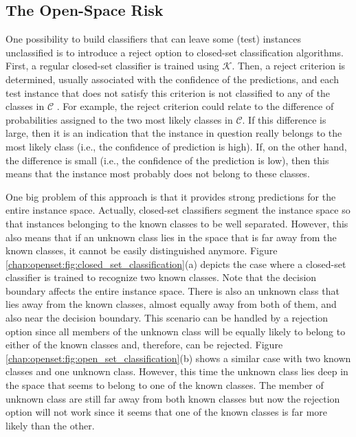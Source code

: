 \subsection{The Open-Space Risk}
\label{chap:openset:sec:open_space_risk}

One possibility to build classifiers that can leave some (test) instances unclassified is to introduce a reject option to closed-set classification algorithms. First, a regular closed-set classifier is trained using $\mathcal{K}$. Then, a reject criterion is determined, usually associated with the confidence of the predictions, and each test instance that does not satisfy this criterion is not classified to any of the classes in $\mathcal{C}$ \parencite{onan2018ensemble}. For example, the reject criterion could relate to the difference of probabilities assigned to the two most likely classes in $\mathcal{C}$. If this difference is large, then it is an indication that the instance in question really belongs to the most likely class (i.e., the confidence of prediction is high). If, on the other hand, the difference is small (i.e., the confidence of the prediction is low), then this means that the instance most probably does not belong to these classes. 

One big problem of this approach is that it provides strong predictions for the entire instance space. Actually, closed-set classifiers segment the instance space so that instances belonging to the known classes to be well separated. However, this also means that if an unknown class lies in the space that is far away from the known classes, it cannot be easily distinguished anymore. Figure \ref{chap:openset:fig:closed_set_classification}(a) depicts the case where a closed-set classifier is trained to recognize two known classes. Note that the decision boundary affects the entire instance space. There is also an unknown class that lies away from the known classes, almost equally away from both of them, and also near the decision boundary. This scenario can be handled by a rejection option since all members of the unknown class will be equally likely to belong to either of the known classes and, therefore, can be rejected. Figure \ref{chap:openset:fig:open_set_classification}(b) shows a similar case with two known classes and one unknown class. However, this time the unknown class lies deep in the space that seems to belong to one of the known classes. The member of unknown class are still far away from both known classes but now the rejection option will not work since it seems that one of the known classes is far more likely than the other. 

